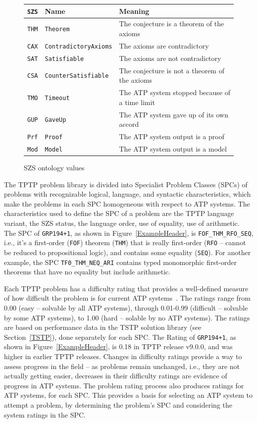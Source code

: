 \documentclass[runningheads]{llncs}
\begin{document}
\begin{figure}[htb]
\centering
\begin{tabular}{lll}
{\tt SZS} & Name                      & Meaning \\
\hline
{\tt THM} & {\tt Theorem}             & The conjecture is a theorem of the axioms \\
{\tt CAX} & {\tt ContradictoryAxioms} & The axioms are contradictory \\
{\tt SAT} & {\tt Satisfiable}         & The axioms are not contradictory \\
{\tt CSA} & {\tt CounterSatisfiable}  & The conjecture is not a theorem of the axioms \\
{\tt TMO} & {\tt Timeout}             & The ATP system stopped because of a time limit \\
{\tt GUP} & {\tt GaveUp}              & The ATP system gave up of its own accord \\
{\tt Prf} & {\tt Proof}               & The ATP system output is a proof \\
{\tt Mod} & {\tt Model}               & The ATP system output is a model \\
\end{tabular}
\caption{SZS ontology values}
\label{SZSTable}
\end{figure} 

The TPTP problem library is divided into Specialist Problem Classes (SPCs) of problems with 
recognizable logical, language, and syntactic characteristics, which make the problems in each 
SPC homogeneous with respect to ATP systems.
The characteristics used to define the SPC of a problem are the TPTP language variant, the SZS
status, the language order, use of equality, use of arithmetic.
The SPC of {\tt GRP194+1}, as shown in Figure~\ref{ExampleHeader}, is {\tt FOF\_THM\_RFO\_SEQ}, 
i.e., it's a first-order ({\tt FOF}) theorem ({\tt THM}) that is really first-order ({\tt RFO} -- 
cannot be reduced to propositional logic), and contains some equality ({\tt SEQ}).
For another example, the SPC {\tt TF0\_THM\_NEQ\_ARI} contains typed monomorphic first-order 
theorems that have no equality but include arithmetic.

Each TPTP problem has a difficulty rating that provides a well-defined measure of how difficult 
the problem is for current ATP systems~\cite{SS01}.
The ratings range from 0.00 (easy -- solvable by all ATP systems), through 0.01-0.99 (difficult -- 
solvable by some ATP systems), to 1.00 (hard -- solable by no ATP systems).
The ratings are based on performance data in the TSTP solution library (see Section~\ref{TSTP}), 
done separately for each SPC.
The Rating of {\tt GRP194+1}, as shown in Figure~\ref{ExampleHeader}, is 0.18 in TPTP release 
v9.0.0, and was higher in earlier TPTP releases.
Changes in difficulty ratings provide a way to assess progress in the field -- as problems remain 
unchanged, i.e., they are not actually getting easier, decreases in their difficulty ratings are 
evidence of progress in ATP systems.
The problem rating process also produces ratings for ATP systems, for each SPC. 
This provides a basis for selecting an ATP system to attempt a problem, by determining the 
problem's SPC and considering the system ratings in the SPC.
\end{document}
